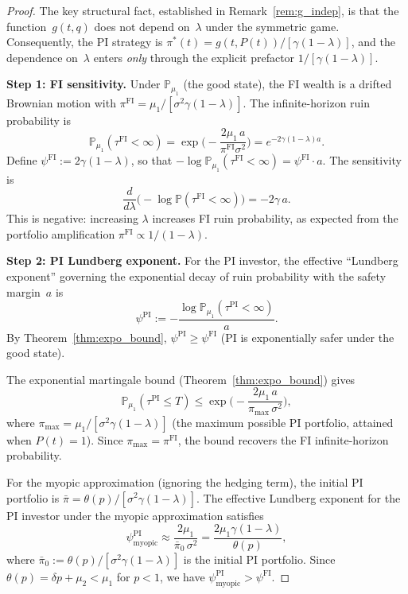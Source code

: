 \documentclass[12pt]{article}
\theoremstyle{remark}
\theoremstyle{definition}
\newcommand{\Prob}{\mathbb{P}}
\newcommand{\FI}{\mathrm{FI}}
\newcommand{\PI}{\mathrm{PI}}
\begin{document}
\begin{proof}
The key structural fact, established in Remark~\ref{rem:g_indep},
is that the function~$g(t,q)$ does not depend on~$\lambda$ under
the symmetric game.
Consequently, the PI strategy is
$\pi^*(t) = g(t,P(t))/[\gamma(1-\lambda)]$,
and the dependence on~$\lambda$ enters \emph{only} through the
explicit prefactor $1/[\gamma(1-\lambda)]$.

\medskip\noindent\textbf{Step 1: FI sensitivity.}
Under $\Prob_{\mu_1}$ (the good state), the FI wealth is a drifted
Brownian motion with $\pi^{\FI} = \mu_1/[\sigma^2\gamma(1-\lambda)]$.
The infinite-horizon ruin probability is
\[
  \Prob_{\mu_1}(\tau^{\FI} < \infty)
  = \exp\!\biggl(-\frac{2\mu_1\,a}{\pi^{\FI}\sigma^2}\biggr)
  = e^{-2\gamma(1-\lambda)a}.
\]
Define $\psi^{\FI} := 2\gamma(1-\lambda)$, so that
$-\log\Prob_{\mu_1}(\tau^{\FI} < \infty) = \psi^{\FI}\cdot a$.
The sensitivity is
\begin{equation}\label{eq:FI_sensitivity}
  \frac{d}{d\lambda}\bigl(-\log\Prob(\tau^{\FI} < \infty)\bigr)
  = -2\gamma\,a.
\end{equation}
This is negative: increasing $\lambda$ increases FI ruin probability,
as expected from the portfolio amplification
$\pi^{\FI} \propto 1/(1-\lambda)$.

\medskip\noindent\textbf{Step 2: PI Lundberg exponent.}
For the PI investor, the effective ``Lundberg exponent'' governing the
exponential decay of ruin probability with the safety margin~$a$ is
\begin{equation}\label{eq:psi_PI}
  \psi^{\PI} := -\frac{\log\Prob_{\mu_1}(\tau^{\PI} < \infty)}{a}.
\end{equation}
By Theorem~\ref{thm:expo_bound}, $\psi^{\PI} \ge \psi^{\FI}$
(PI is exponentially safer under the good state).

The exponential martingale bound (Theorem~\ref{thm:expo_bound})
gives
\[
  \Prob_{\mu_1}(\tau^{\PI} \le T)
  \le \exp\!\biggl(-\frac{2\mu_1\,a}{\pi_{\max}\,\sigma^2}\biggr),
\]
where $\pi_{\max} = \mu_1/[\sigma^2\gamma(1-\lambda)]$
(the maximum possible PI portfolio, attained when $P(t) = 1$).
Since $\pi_{\max} = \pi^{\FI}$, the bound recovers the FI
infinite-horizon probability.

For the myopic approximation (ignoring the hedging term), the initial
PI portfolio is $\bar{\pi} = \theta(p)/[\sigma^2\gamma(1-\lambda)]$.
The effective Lundberg exponent for the PI investor under the myopic
approximation satisfies
\begin{equation}\label{eq:psi_PI_myopic}
  \psi^{\PI}_{\mathrm{myopic}} \approx \frac{2\mu_1}{\bar{\pi}_0\,\sigma^2}
  = \frac{2\mu_1\gamma(1-\lambda)}{\theta(p)},
\end{equation}
where $\bar{\pi}_0 := \theta(p)/[\sigma^2\gamma(1-\lambda)]$ is the
initial PI portfolio.
Since $\theta(p) = \delta p + \mu_2 < \mu_1$ for $p < 1$, we have
$\psi^{\PI}_{\mathrm{myopic}} > \psi^{\FI}$.


\end{proof}
\end{document}
